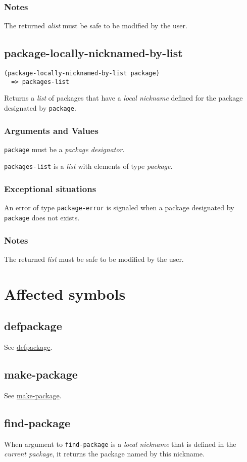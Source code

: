\documentclass[11pt]{article}
\begin{document}
\subsubsection{Notes}
\label{sec:org54d550a}
The returned \emph{alist} must be safe to be modified by the user.
\subsection{package-locally-nicknamed-by-list}
\label{sec:org2a80039}
\begin{verbatim}
(package-locally-nicknamed-by-list package)
  => packages-list
\end{verbatim}

Returns a \emph{list} of packages that have a \emph{local nickname} defined for the
package designated by \texttt{package}.
\subsubsection{Arguments and Values}
\label{sec:orgdbb44b6}
\texttt{package} must be a \emph{package designator}.

\texttt{packages-list} is a \emph{list} with elements of type \emph{package}.
\subsubsection{Exceptional situations}
\label{sec:org459731b}
An error of type \texttt{package-error} is signaled when a package designated by
\texttt{package} does not exists.
\subsubsection{Notes}
\label{sec:org11e220f}
The returned \emph{list} must be safe to be modified by the user.
\section{Affected symbols}
\label{sec:org54d1856}
\subsection{defpackage}
\label{sec:orgf225e42}
See \hyperref[sec:org393c69d]{defpackage}.
\subsection{make-package}
\label{sec:org8f714e5}
See \hyperref[sec:org662ac14]{make-package}.
\subsection{find-package}
\label{sec:orgac33fab}
When argument to \texttt{find-package} is a \emph{local nickname} that is defined in
the \emph{current package}, it returns the package named by this nickname.
\end{document}
